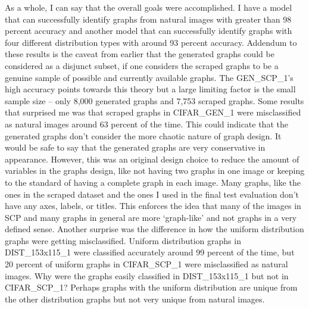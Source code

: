 \documentclass[12pt]{article}
\begin{document}
       
            As a whole, I can say that the overall goals were accomplished. 
            I have a model that can successfully identify graphs from natural images 
            with greater than 98 percent accuracy and another model that can successfully identify graphs 
            with four different distribution types with around 93 percent accuracy. 
            Addendum to these results is the caveat from earlier that the generated graphs could be considered as a disjunct subset, 
            if one considers the scraped graphs to be a genuine sample of possible and currently available graphs. 
            The GEN\_SCP\_1’s high accuracy points towards this theory but a large limiting factor is the small sample size -- 
            only 8,000 generated graphs and 7,753 scraped graphs. 
            Some results that surprised me was that scraped graphs in CIFAR\_GEN\_1 were misclassified as natural images 
            around 63 percent of the time. This could indicate 
            that the generated graphs don’t consider the more chaotic nature of graph design. 
            It would be safe to say that the generated graphs are very conservative in appearance. 
            However, this was an original design choice to reduce the amount of variables in the graphs design, 
            like not having two graphs in one image or keeping to the standard of having a complete graph in each image. 
            Many graphs, like the ones in the scraped dataset 
            and the ones I used in the final test evaluation don’t have any axes, labels, or titles. 
            This enforces the idea that many of the images in SCP and many graphs in general are more ‘graph-like’ 
            and not graphs in a very defined sense.
            Another surprise was the difference in how the uniform distribution graphs were getting misclassified.
            Uniform distribution graphs in DIST\_153x115\_1 were classified accurately around 99 percent of the time, 
            but 20 percent of uniform graphs in CIFAR\_SCP\_1 were misclassified as natural images. 
            Why were the graphs easily classified in DIST\_153x115\_1 but not in CIFAR\_SCP\_1? 
            Perhaps graphs with the uniform distribution are unique from the other distribution graphs but not very unique from natural images.
            
\end{document}
